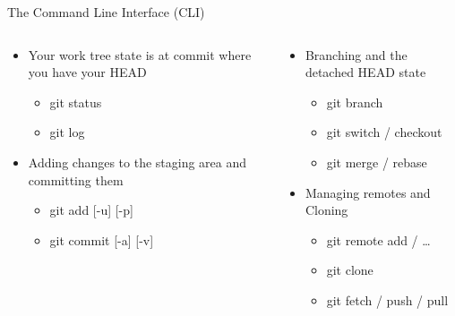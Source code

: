 \documentclass[xetex]{beamer}
\begin{document}
\begin{frame}{The Command Line Interface (CLI)}
  \begin{columns}[t]
    \begin{column}{.5\linewidth}
      \begin{itemize}
        \item Your work tree state is at commit where you have your HEAD
          \begin{itemize} \ttfamily 
            \item git status
            \item git log
          \end{itemize}
        \item Adding changes to the staging area and committing them
          \begin{itemize} \ttfamily
            \item git add [-u] [-p]
            \item git commit [-a] [-v]
          \end{itemize}
      \end{itemize}
    \end{column}
    \begin{column}{.5\linewidth}
      \begin{itemize}
        \item Branching and the detached HEAD state
          \begin{itemize} \ttfamily
            \item git branch
            \item git switch / checkout
            \item git merge / rebase
          \end{itemize}
        \item Managing remotes and Cloning
          \begin{itemize} \ttfamily
            \item git remote add / \ldots
            \item git clone
            \item git fetch / push / pull
          \end{itemize}
      \end{itemize}
    \end{column}
  \end{columns}
\end{frame}
\end{document}
